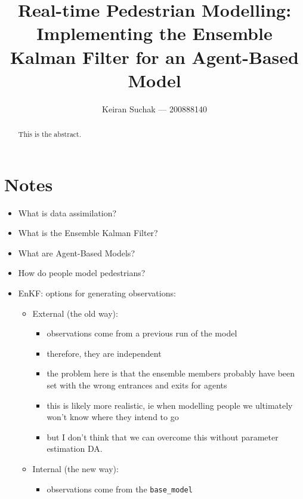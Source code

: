 \documentclass[12pt, twoside, a4paper]{report}
\begin{document}
\title{Real-time Pedestrian Modelling: Implementing the Ensemble Kalman Filter
for an Agent-Based Model}
\author{Keiran Suchak --- 200888140}
\maketitle

\begin{abstract}
This is the abstract.
\end{abstract}

\tableofcontents
\listoffigures
\listoftables

\chapter*{Notes}

\begin{itemize}
    \item What is data assimilation?
    \item What is the Ensemble Kalman Filter?
    \item What are Agent-Based Models?
    \item How do people model pedestrians?
    \item EnKF: options for generating observations:
        \begin{itemize}
            \item External (the old way):
                \begin{itemize}
                    \item observations come from a previous run of the model
                    \item therefore, they are independent
                    \item the problem here is that the ensemble members probably
                        have been set with the wrong entrances and exits for
                        agents
                    \item this is likely more realistic, ie when modelling
                        people we ultimately won't know where they intend to go
                    \item but I don't think that we can overcome this without
                        parameter estimation DA.
                \end{itemize}
            \item Internal (the new way):
                \begin{itemize}
                    \item observations come from the \texttt{base\_model}

\end{itemize}
\end{itemize}
\end{itemize}
\end{document}
